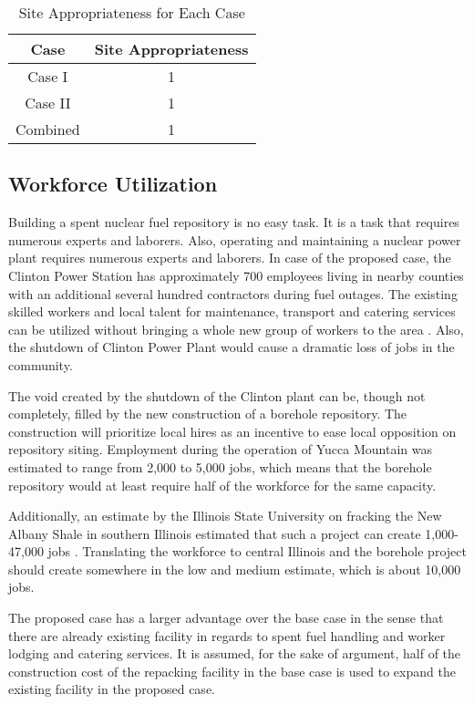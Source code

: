 \begin{table}[h]
	\centering
        \caption {Site Appropriateness for Each Case}
		\begin{tabular}{|c|c|}
			\hline
			Case & Site Appropriateness \\
			\hline
			Case I & 1 \\
			Case II & 1 \\
			Combined & 1\\ 
			\hline
                \end{tabular}
\end{table}

\subsection{Workforce Utilization}

Building a spent nuclear fuel repository is no easy task. It is a task that requires
numerous experts and laborers. Also, operating and maintaining a nuclear power plant
requires numerous experts and laborers. In case of the proposed case, the Clinton
 Power Station has approximately 700 employees living in nearby counties with an
additional several hundred contractors during fuel 
outages\cite{exelon_clinton_2016}.
The existing skilled workers and local talent for maintenance, transport and catering
services can be utilized without bringing a whole new group of workers to the 
area \cite{iaea_managing_2008}. Also, the shutdown of Clinton Power Plant would cause a dramatic
loss of jobs in the community. 

The void created by the shutdown of the Clinton plant can be, though not
completely, filled by the new construction of a borehole repository. The construction
will prioritize local hires as an incentive to ease local opposition on repository
 siting. Employment during the operation of Yucca Mountain was estimated to range from
 2,000 to 5,000 jobs, \cite{riddel_economic_2003} which means that the borehole repository
 would at least require half of the workforce for the same capacity. 

Additionally, an estimate by the Illinois State University on fracking the New Albany
Shale in southern Illinois estimated that such a project can create 1,000-47,000 jobs
\cite{loomis_potential_2012}. Translating the workforce to central Illinois and the borehole
project should create somewhere in the low and medium estimate, which is about 10,000
jobs.   

The proposed case has a larger advantage over the base case in the sense that there
are already existing facility in regards to spent fuel handling and worker lodging 
and catering services. 
It is assumed, for the sake of argument, half of the construction cost of the
repacking facility in the base case is used to expand the existing facility in the
proposed case. 


